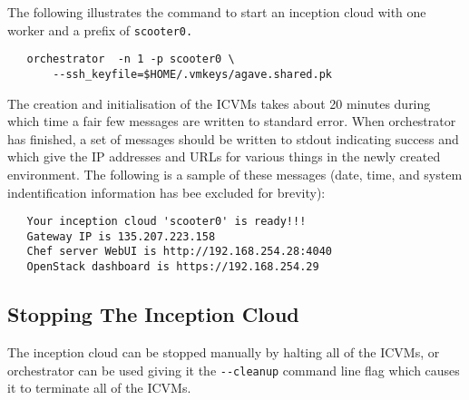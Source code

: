 \dlbeg{0.85in}

\vspace{5pt}

\vspace{5pt}

\vspace{5pt}

\vspace{5pt}
\dlend

\noindent
The following illustrates the command to start an inception cloud with one worker and a prefix of \verb!scooter0.!

\small\begin{verbatim}
   orchestrator  -n 1 -p scooter0 \
       --ssh_keyfile=$HOME/.vmkeys/agave.shared.pk
\end{verbatim}\normalsize
\noindent
The creation and initialisation of the ICVMs takes about 20 minutes during which time a fair few messages
are written to standard error.
When orchestrator has finished, a set of messages should be written to stdout indicating success and which give the IP
addresses and URLs for various things in the newly created environment.
The following is a sample of these messages (date, time, and system indentification information has bee excluded for brevity):

\small\begin{verbatim}
   Your inception cloud 'scooter0' is ready!!!
   Gateway IP is 135.207.223.158
   Chef server WebUI is http://192.168.254.28:4040
   OpenStack dashboard is https://192.168.254.29
\end{verbatim}\normalsize

\subsection{Stopping The Inception Cloud}
The inception cloud can be stopped manually by halting all of the ICVMs, or orchestrator can be used
giving it the \verb!--cleanup! command line flag which causes it to terminate all of the ICVMs.

